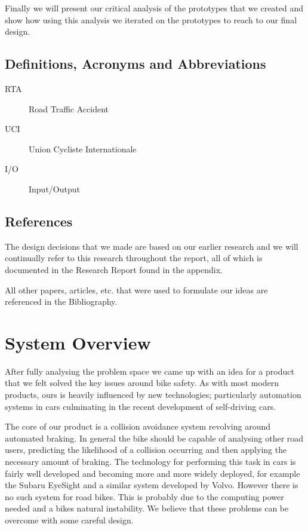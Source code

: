 \documentclass[a4paper]{report}
\begin{document}
Finally we will present our critical analysis of the prototypes that we created and show how using this analysis we iterated on the prototypes to reach to our final design.

\section{Definitions, Acronyms and Abbreviations}
\begin{description}
\item[RTA] Road Traffic Accident
\item[UCI] Union Cycliste Internationale
\item [I/O] Input/Output
\end{description}
\section{References}
The design decisions that we made are based on our earlier research and we will continually refer to this research throughout the report, all of which is documented in the Research Report found in the appendix. 

All other papers, articles, etc. that were used to formulate our ideas are referenced in the Bibliography.

\chapter{System Overview}
After fully analysing the problem space we came up with an idea for a product that we felt solved the key issues around bike safety. As with most modern products, ours is heavily influenced by new technologies; particularly automation systems in cars culminating in the recent development of self-driving cars. %

The core of our product is a collision avoidance system revolving around automated braking. In general the bike should be capable of analysing other road users, predicting the likelihood of a collision occurring and then applying the necessary amount of braking. The technology for performing this task in cars is fairly well developed and becoming more and more widely deployed, for example the Subaru EyeSight\cite{eyesight} and a similar system developed by Volvo\cite{volvo}. However there is no such system for road bikes. This is probably due to the computing power needed and a bikes natural instability. We believe that these problems can be overcome with some careful design.
\end{document}

